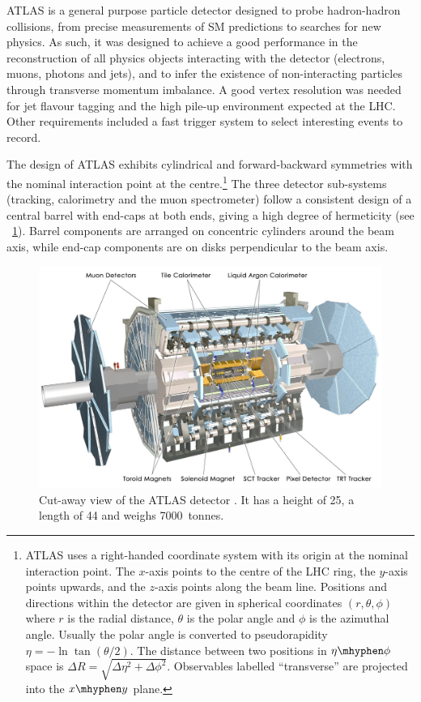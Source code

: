 
ATLAS is a general purpose particle detector designed to probe hadron-hadron collisions, 
from precise measurements of \ac{SM} predictions to searches for new physics.
As such, it was designed to achieve a good performance in the reconstruction of all 
physics objects interacting with the detector (electrons, muons, photons and jets), and 
to infer the existence of non-interacting particles through transverse momentum imbalance.
A good vertex resolution was needed for jet flavour tagging and the high pile-up 
environment expected at the \ac{LHC}. Other requirements included a fast trigger system 
to select interesting events to record.

The design of ATLAS exhibits cylindrical and forward-backward symmetries with the nominal 
interaction point at the centre.\footnote{
	ATLAS uses a right-handed coordinate system with its origin at the nominal 
	interaction point. The $x$-axis points to the centre of the \ac{LHC} ring, the 
	$y$-axis points upwards, and the $z$-axis points along the beam line. Positions and 
	directions within the detector are given in spherical coordinates $(r, \theta, \phi)$ 
	where $r$ is the radial distance, $\theta$ is the polar angle and $\phi$ is the 
	azimuthal angle. Usually the polar angle is converted to pseudorapidity 
	$\eta = -\ln\tan(\theta/2)$. The distance between two positions in $\eta\mhyphen\phi$ 
	space is $\Delta R = \sqrt{\Delta\eta^2 + \Delta\phi^2}$.
	Observables labelled ``transverse'' are projected into the $x\mhyphen y$ plane.
} 
The three detector sub-systems (tracking, calorimetry and the muon spectrometer) 
follow a consistent design of a central barrel with end-caps at both ends, giving a high 
degree of hermeticity (see \Figure~\ref{fig:atlas_whole}). Barrel components are arranged 
on concentric cylinders around the beam axis, while end-cap components are on disks 
perpendicular to the beam axis.

\begin{figure}
	\includegraphics[width=\textwidth]{tex/experiment/atlas_whole}
	\caption{Cut-away view of the ATLAS detector \cite{ATLAS-detector}. It has a height 
	of \unit{25}{\metre}, a length of \unit{44}{\metre} and weighs 7000~tonnes.}
	\label{fig:atlas_whole}
\end{figure}

